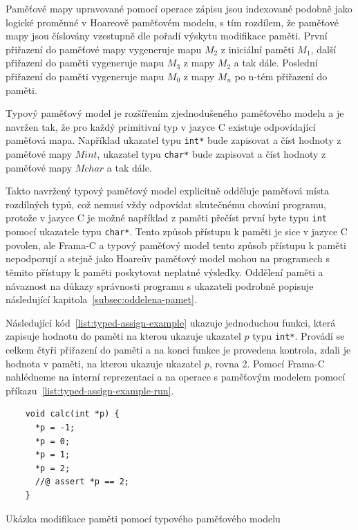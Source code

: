 Paměťové mapy upravované pomocí operace zápisu jsou indexované podobně jako logické proměnné v Hoareově paměťovém modelu,
s tím rozdílem, že paměťové mapy jsou číslovány vzestupně dle pořadí výskytu modifikace paměti.
První přiřazení do paměťové mapy vygeneruje mapu $M_2$ z iniciální paměti $M_1$,
další přiřazení do paměti vygeneruje mapu $M_3$ z mapy $M_2$ a tak dále.
Poslední přiřazení do paměti vygeneruje mapu $M_0$ z mapy $M_n$ po n-tém přiřazení do paměti.

Typový paměťový model je rozšířením zjednodušeného paměťového modelu
a je navržen tak, že pro každý primitivní typ v jazyce C existuje odpovídající paměťová mapa.
Například ukazatel typu \texttt{int*} bude zapisovat a číst hodnoty z paměťové mapy $Mint$,
ukazatel typu \texttt{char*} bude zapisovat a číst hodnoty z paměťové mapy $Mchar$ a tak dále.


Takto navržený typový paměťový model explicitně odděluje paměťová místa rozdílných typů,
což nemusí vždy odpovídat skutečnému chování programu,
protože v jazyce C je možné například z paměti přečíst první byte typu \texttt{int}
pomocí ukazatele typu \texttt{char*}.
Tento způsob přístupu k paměti je sice v jazyce C povolen,
ale Frama\mbox{-}C a typový paměťový model tento způsob přístupu k paměti nepodporují
a stejně jako Hoareův paměťový model mohou na programech s těmito přístupy k paměti poskytovat neplatné výsledky.
Oddělení paměti a návaznost na důkazy správnosti programu s ukazateli
podrobně popisuje následující kapitola~\ref{subsec:oddelena-pamet}.

Následující kód~\ref{list:typed-assign-example} ukazuje jednoduchou funkci,
která zapisuje hodnotu do paměti na kterou ukazuje ukazatel $p$ typu \texttt{int*}.
Provádí se celkem čtyři přiřazení do paměti a na konci funkce je provedena kontrola,
zdali je hodnota v paměti, na kterou ukazuje ukazatel $p$, rovna 2.
Pomocí Frama\mbox{-}C nahlédneme na interní reprezentaci
a na operace s paměťovým modelem pomocí příkazu~\ref{list:typed-assign-example-run}.

\begin{listing}[H]
    \begin{verbatim}
    void calc(int *p) {
      *p = -1;
      *p = 0;
      *p = 1;
      *p = 2;
      //@ assert *p == 2;
    }
    \end{verbatim}
    \caption{Ukázka modifikace paměti pomocí typového paměťového modelu}
    \label{list:typed-assign-example}
\end{listing}

